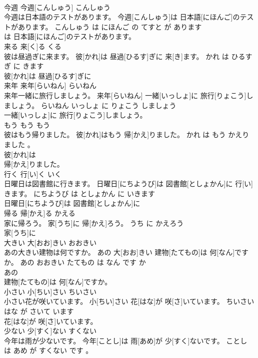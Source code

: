 \documentclass[8pt]{extreport}
\begin{document}
\begin{CJK}{UTF8}{min}
\\	今週	今週[こんしゅう]	こんしゅう	
\\	今週は日本語のテストがあります。	今週[こんしゅう]は 日本語[にほんご]のテストがあります。	こんしゅう は にほんご の てすと が あります	
\\	は 日本語[にほんご]のテストがあります。			
\\	来る	来[く]る	くる	
\\	彼は昼過ぎに来ます。	彼[かれ]は 昼過[ひるす]ぎに 来[き]ます。	かれ は ひるすぎ に きます	
\\	彼[かれ]は 昼過[ひるす]ぎに
\\	来年	来年[らいねん]	らいねん	
\\	来年一緒に旅行しましょう。	来年[らいねん] 一緒[いっしょ]に 旅行[りょこう]しましょう。	らいねん いっしょ に りょこう しましょう	
\\	一緒[いっしょ]に 旅行[りょこう]しましょう。			
\\	もう	もう	もう	
\\	彼はもう帰りました。	彼[かれ]はもう 帰[かえ]りました。	かれ は もう かえりました 。	
\\	彼[かれ]は
\\	帰[かえ]りました。			
\\	行く	行[い]く	いく	
\\	日曜日は図書館に行きます。	日曜日[にちようび]は 図書館[としょかん]に 行[い]きます。	にちようび は としょかん に いきます	
\\	日曜日[にちようび]は 図書館[としょかん]に
\\	帰る	帰[かえ]る	かえる	
\\	家に帰ろう。	家[うち]に 帰[かえ]ろう。	うち に かえろう	
\\	家[うち]に
\\	大きい	大[おお]きい	おおきい	
\\	あの大きい建物は何ですか。	あの 大[おお]きい 建物[たてもの]は 何[なん]ですか。	あの おおきい たてもの は なん です か	
\\	あの
\\	建物[たてもの]は 何[なん]ですか。			
\\	小さい	小[ちい]さい	ちいさい	
\\	小さい花が咲いています。	小[ちい]さい 花[はな]が 咲[さ]いています。	ちいさい はな が さいて います	
\\	花[はな]が 咲[さ]いています。			
\\	少ない	少[すく]ない	すくない	
\\	今年は雨が少ないです。	今年[ことし]は 雨[あめ]が 少[すく]ないです。	ことし は あめ が すくない です 。	

\end{CJK}
\end{document}
